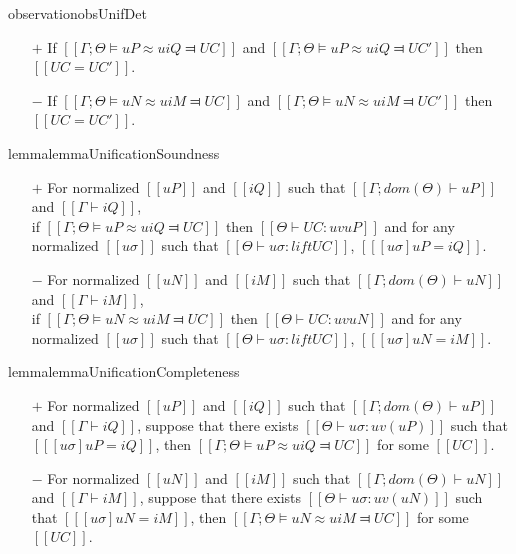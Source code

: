 \begin{restatable}{observation}{obsUnifDet}
    \label{obs:unif-deterministic}
    \hfill
    \begin{itemize}
        \item [$+$] If $[[Γ ; Θ ⊨ uP ≈u iQ ⫤ UC]]$
            and $[[Γ ; Θ ⊨ uP ≈u iQ ⫤ UC']]$ then $[[UC = UC']]$.
        \item [$-$] If $[[Γ ; Θ ⊨ uN ≈u iM ⫤ UC]]$
            and $[[Γ ; Θ ⊨ uN ≈u iM ⫤ UC']]$ then $[[UC = UC']]$.
    \end{itemize}
\end{restatable}

\begin{restatable}{lemma}{lemmaUnificationSoundness}
    \label{lemma:unification-soundness}
    \hfill
    \begin{itemize}
        \item [$+$] For normalized $[[uP]]$ and $[[iQ]]$ such that 
        $[[Γ ; dom(Θ) ⊢ uP]]$ and $[[Γ ⊢ iQ]]$,\\ 
        if $[[Γ ; Θ ⊨ uP ≈u iQ ⫤ UC]]$ then 
        $[[Θ ⊢ UC : uv uP]]$ and for any normalized $[[uσ]]$ 
        such that $[[ Θ ⊢ uσ : lift UC ]]$, $[[ [uσ]uP = iQ ]]$.

        \item [$-$] For normalized $[[uN]]$ and $[[iM]]$ such that
        $[[Γ ; dom(Θ) ⊢ uN]]$ and $[[Γ ⊢ iM]]$,\\
        if $[[Γ ; Θ ⊨ uN ≈u iM ⫤ UC]]$ then 
        $[[Θ ⊢ UC : uv uN]]$ and for any normalized $[[uσ]]$ such that
        $[[ Θ   ⊢ uσ : lift UC ]]$, $[[ [uσ]uN = iM ]]$.
    \end{itemize}
\end{restatable}

\begin{restatable}{lemma}{lemmaUnificationCompleteness}
    \label{lemma:unification-completeness}
    \hfill
    \begin{itemize}
        \item [$+$] For normalized $[[uP]]$ and $[[iQ]]$ such that
        $[[Γ ; dom(Θ) ⊢ uP]]$ and $[[Γ ⊢ iQ]]$, 
        suppose that there exists $[[Θ ⊢ uσ : uv(uP)]]$ such that $[[ [uσ]uP = iQ ]]$,
        then $[[Γ ; Θ ⊨ uP ≈u iQ ⫤ UC]]$ for some $[[UC]]$.
        
        \item [$-$] For normalized $[[uN]]$ and $[[iM]]$ such that
        $[[Γ ; dom(Θ) ⊢  uN]]$ and $[[Γ ⊢ iM]]$,
        suppose that there exists $[[Θ ⊢ uσ : uv(uN)]]$ such that $[[ [uσ]uN = iM ]]$,
        then $[[Γ ; Θ ⊨ uN ≈u iM ⫤ UC]]$ for some $[[UC]]$.
   \end{itemize}
\end{restatable}
